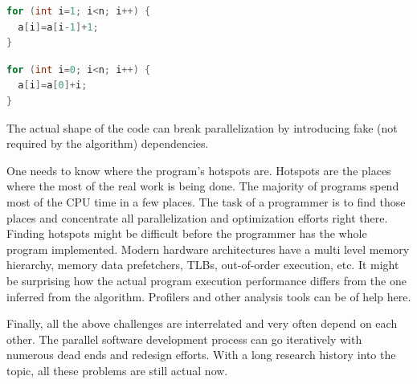 \begin{description}[style=unboxed,leftmargin=0cm]
\begin{minipage}[t]{0.50\linewidth}
\begin{lstlisting}[caption={\raggedright Non-parallelizable loop with planted loop-carried data dependence.},label={lst:code_sample_data_dependence},language=C]
for (int i=1; i<n; i++) {
  a[i]=a[i-1]+1;
}
\end{lstlisting}
\end{minipage}
\begin{minipage}[t]{0.50\linewidth}
\begin{lstlisting}[caption={\raggedright Parallelizable loop free of any data dependencies.}, label={lst:code_sample_no_data_dependence},language=C]
for (int i=0; i<n; i++) {
  a[i]=a[0]+i;
}
\end{lstlisting}
\end{minipage}

The actual shape of the code can break parallelization by introducing fake (not required by the algorithm) dependencies.
\item[Performance analysis and tuning] One needs to know where the program's hotspots are. Hotspots are the places where the most of the real work is being done. The majority of programs spend most of the CPU time in a few places. The task of a programmer is to find those places and concentrate all parallelization and optimization efforts right there. Finding hotspots might be difficult before the programmer has the whole program implemented. Modern hardware architectures have a multi level memory hierarchy, memory data prefetchers, TLBs, out-of-order execution, etc. It might be surprising how the actual program execution performance differs from the one inferred from the algorithm. Profilers and other analysis tools can be of help here.
\end{description}
\quad Finally, all the above challenges are interrelated and very often depend on each other. The parallel software development process can go iteratively with numerous dead ends and redesign efforts. With a long research history into the topic, all these problems are still actual now.
